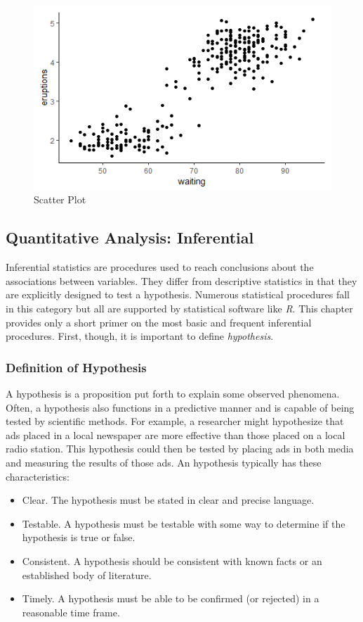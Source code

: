 \begin{figure}[H]
	\centering
	\includegraphics[width=\maxwidth{.95\linewidth}]{gfx/14-Faithful}
	\caption{Scatter Plot}
	\label{14:fig05}
\end{figure}

\subsection{Quantitative Analysis: Inferential}

Inferential statistics are procedures used to reach conclusions about the associations between variables. They differ from descriptive statistics in that they are explicitly designed to test a hypothesis. Numerous statistical procedures fall in this category but all are supported by statistical software like \textit{R}. This chapter provides only a short primer on the most basic and frequent inferential procedures. First, though, it is important to define \textit{hypothesis}.

\subsubsection{Definition of Hypothesis}

A hypothesis is a proposition put forth to explain some observed phenomena. Often, a hypothesis also functions in a predictive manner and is capable of being tested by scientific methods. For example, a researcher might hypothesize that ads placed in a local newspaper are more effective than those placed on a local radio station. This hypothesis could then be tested by placing ads in both media and measuring the results of those ads. An hypothesis typically has these characteristics:

\begin{itemize}
	\item Clear. The hypothesis must be stated in clear and precise language.
	\item Testable. A hypothesis must be testable with some way to determine if the hypothesis is true or false.
	\item Consistent. A hypothesis should be consistent with known facts or an established body of literature.
	\item Timely. A hypothesis must be able to be confirmed (or rejected) in a reasonable time frame.
\end{itemize} 

